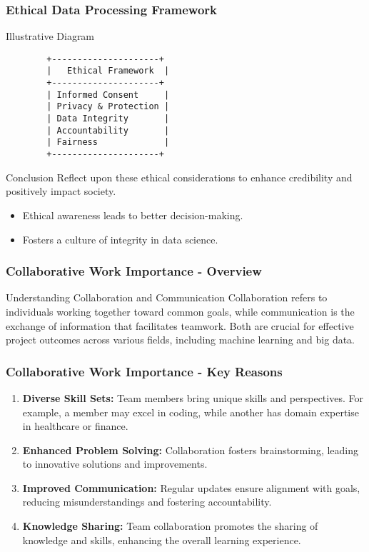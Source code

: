 \documentclass[aspectratio=169]{beamer}
\begin{document}
\begin{frame}[fragile]
    \frametitle{Ethical Data Processing Framework}
    \begin{block}{Illustrative Diagram}
        \centering
        \begin{verbatim}
        +---------------------+
        |   Ethical Framework  |
        +---------------------+
        | Informed Consent     |
        | Privacy & Protection |
        | Data Integrity       |
        | Accountability       |
        | Fairness             |
        +---------------------+
        \end{verbatim}
    \end{block}
    
    \begin{block}{Conclusion}
        Reflect upon these ethical considerations to enhance credibility and positively impact society. 
    \end{block}
    
    \begin{itemize}
        \item Ethical awareness leads to better decision-making.
        \item Fosters a culture of integrity in data science.
    \end{itemize}
\end{frame}

\begin{frame}[fragile]
    \frametitle{Collaborative Work Importance - Overview}
    \begin{block}{Understanding Collaboration and Communication}
        Collaboration refers to individuals working together toward common goals, while communication is the exchange of information that facilitates teamwork. Both are crucial for effective project outcomes across various fields, including machine learning and big data.
    \end{block}
\end{frame}

\begin{frame}[fragile]
    \frametitle{Collaborative Work Importance - Key Reasons}
    \begin{enumerate}
        \item \textbf{Diverse Skill Sets:} Team members bring unique skills and perspectives. For example, a member may excel in coding, while another has domain expertise in healthcare or finance.
        
        \item \textbf{Enhanced Problem Solving:} Collaboration fosters brainstorming, leading to innovative solutions and improvements.
        
        \item \textbf{Improved Communication:} Regular updates ensure alignment with goals, reducing misunderstandings and fostering accountability.
        
        \item \textbf{Knowledge Sharing:} Team collaboration promotes the sharing of knowledge and skills, enhancing the overall learning experience.
    \end{enumerate}
\end{frame}
\end{document}
